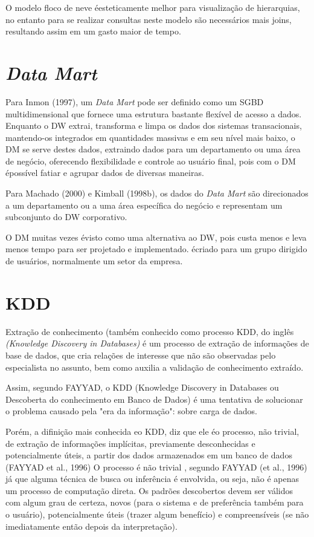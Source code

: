 O modelo floco de neve \'{e}esteticamente melhor para visualização de hierarquias, no entanto para se realizar consultas neste modelo são necessários mais joins, resultando assim em um gasto maior de tempo.
	
\section{\textit{Data Mart}}

Para Inmon (1997), um \textit{Data Mart} pode ser definido como um SGBD multidimensional que fornece uma estrutura bastante flexível de acesso a dados. Enquanto o DW extrai, transforma e limpa os dados dos sistemas transacionais, mantendo-os integrados em quantidades massivas e em seu nível mais baixo, o DM se serve destes dados, extraindo dados para um departamento ou uma área de negócio, oferecendo flexibilidade e controle ao usuário final, pois com o DM \'{e}possível fatiar e agrupar dados de diversas maneiras.

Para Machado (2000) e Kimball (1998b), os dados do \textit{Data Mart} são direcionados a um departamento ou a uma área específica do negócio e representam um subconjunto do DW corporativo.

O DM muitas vezes \'{e}visto como uma alternativa ao DW, pois custa menos e leva menos tempo para ser projetado e implementado. \'{e}criado para um grupo dirigido de usuários, normalmente um setor da empresa.

\section{KDD}

Extra\c{c}\~{a}o de conhecimento (tamb\'{e}m conhecido como processo KDD, do inglês 
\textit{(Knowledge Discovery in Databases)} \'{e} um processo de extra\c{c}\~{a}o de informa\c{c}ões de base de dados, que cria rela\c{c}ões de interesse que n\~{a}o s\~{a}o observadas pelo especialista no assunto, bem como auxilia a valida\c{c}\~{a}o de conhecimento extraído.

Assim, segundo FAYYAD, o KDD (Knowledge Discovery in Databases ou Descoberta do conhecimento em Banco de Dados) \'{e} uma tentativa de solucionar o problema causado pela "era da informa\c{c}\~{a}o": sobre carga de dados.

Por\'{e}m, a difini\c{c}\~{a}o mais conhecida eo KDD, diz que ele \'{e}o processo, não trivial, de extração de informações implícitas, previamente desconhecidas e potencialmente úteis, a partir dos dados armazenados em um banco de dados (FAYYAD et al., 1996)
O processo \'{e} n\~{a}o trivial , segundo FAYYAD (et al., 1996) j\'{a} que alguma t\'{e}cnica de busca ou inferência \'{e} envolvida, ou seja, n\~{a}o \'{e} apenas um processo de computa\c{c}\~{a}o direta. Os padrões descobertos devem ser v\'{a}lidos com algum grau de certeza, novos (para o sistema e de preferência tamb\'{e}m para o usu\'{a}rio), potencialmente úteis (trazer algum benefício) e compreensíveis (se n\~{a}o imediatamente ent\~{a}o depois da interpreta\c{c}\~{a}o).

